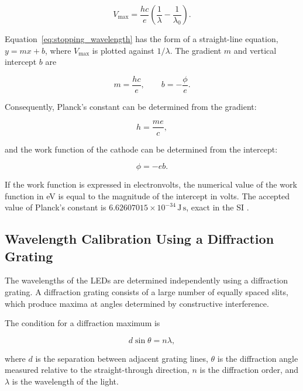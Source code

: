 \documentclass[12pt,a4paper]{article}
\begin{document}
\begin{equation}
    V_{\max} = \frac{hc}{e}
    \left(\frac{1}{\lambda}-\frac{1}{\lambda_0}\right).
    \label{eq:threshold_wavelength}
\end{equation}

Equation~\ref{eq:stopping_wavelength} has the form of a straight-line equation, \(y=mx+b\), where \(V_{\max}\) is plotted against \(1/\lambda\). The gradient \(m\) and vertical intercept \(b\) are

\begin{equation}
    m = \frac{hc}{e},
    \qquad
    b = -\frac{\phi}{e}.
    \label{eq:gradient_intercept}
\end{equation}

Consequently, Planck's constant can be determined from the gradient:

\begin{equation}
    h = \frac{me}{c},
    \label{eq:planck}
\end{equation}

and the work function of the cathode can be determined from the intercept:

\begin{equation}
    \phi = -eb.
    \label{eq:work_function}
\end{equation}

If the work function is expressed in electronvolts, the numerical value of the work function in eV is equal to the magnitude of the intercept in volts. The accepted value of Planck's constant is \(6.62607015\times10^{-34}\,\mathrm{J\,s}\), exact in the SI \cite{nistconstants}.

\subsection{Wavelength Calibration Using a Diffraction Grating}

The wavelengths of the LEDs are determined independently using a diffraction grating. A diffraction grating consists of a large number of equally spaced slits, which produce maxima at angles determined by constructive interference.

The condition for a diffraction maximum is \cite{py2107}

\begin{equation}
    d\sin\theta = n\lambda,
    \label{eq:grating}
\end{equation}

where \(d\) is the separation between adjacent grating lines, \(\theta\) is the diffraction angle measured relative to the straight-through direction, \(n\) is the diffraction order, and \(\lambda\) is the wavelength of the light.
\end{document}
